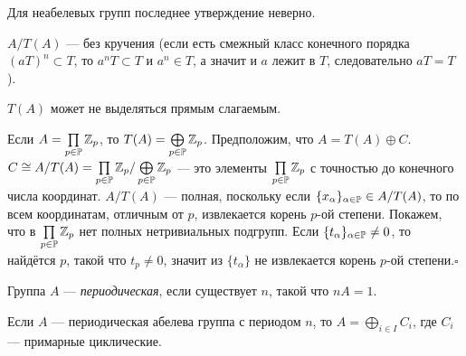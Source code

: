 \documentclass[10pt,a4paper]{article}
\begin{document}
\begin{note}
Для неабелевых групп последнее утверждение неверно.
\end{note}

$A/T(A)$ --- без кручения (если есть смежный класс конечного
порядка $(aT)^n\subset T$, то $a^nT\subset T$ и $a^n\in T$, а
значит и $a$ лежит в $T$, следовательно $aT=T$).

\begin{ex}
$T(A)$ может не выделяться прямым слагаемым.

Если $A=\prod\limits_{p\in\mathbb P}\mathbb Z_p$, то
$T(A)=\bigoplus\limits_{p\in\mathbb P}\mathbb Z_p$. Предположим, что
$A=T(A)\oplus C$. $C\cong
A/T(A)=\prod\limits_{p\in\mathbb P}\mathbb Z_p/\bigoplus\limits_{p\in\mathbb P}\mathbb Z_p$
--- это элементы $\prod\limits_{p\in\mathbb P}\mathbb Z_p$ с точностью до
конечного числа координат. $A/T(A)$ --- полная, поскольку если
$\{x_\alpha\}_{\alpha\in\mathbb P}\in A/T(A)$, то по всем координатам,
отличным от $p$, извлекается корень $p$-ой степени. Покажем, что в
$\prod\limits_{p\in\mathbb P}\mathbb Z_p$ нет полных нетривиальных подгрупп.
Если $\{t_\alpha\}_{\alpha\in\mathbb P}\ne 0$, то найдётся $p$, такой
что $t_p\ne 0$, значит из $\{t_\alpha\}$ не извлекается корень
$p$-ой степени.$\square$
\end{ex}

Группа $A$ --- {\em периодическая},
если существует $n$, такой что $nA=1$.

\begin{theorem}Если $A$ --- периодическая абелева группа
с периодом $n$, то $A=\bigoplus\limits_{i\in I}C_i$, где $C_i$
--- примарные циклические.
\end{theorem}
\end{document}
